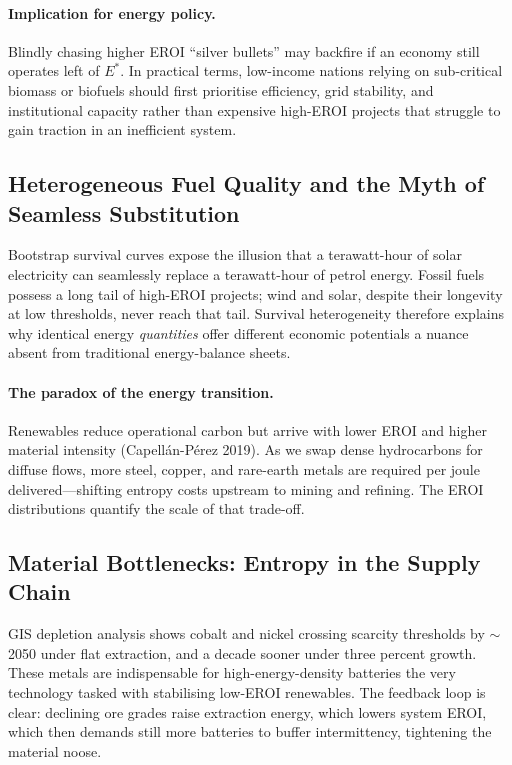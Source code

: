 \documentclass[a4paper,12pt]{article}
\begin{document}
\paragraph{Implication for energy policy.}
Blindly chasing higher EROI “silver bullets” may backfire if an economy still
operates left of \(E^{*}\).  In practical terms, low-income nations relying on
sub-critical biomass or biofuels should first prioritise efficiency, grid
stability, and institutional capacity rather than expensive high-EROI projects
that struggle to gain traction in an inefficient system.

\subsection{Heterogeneous Fuel Quality and the Myth of Seamless Substitution}
\label{sec:disc_hetero}

Bootstrap survival curves expose the illusion that a terawatt-hour of solar
electricity can seamlessly replace a terawatt-hour of petrol energy.  Fossil
fuels possess a long tail of high-EROI projects; wind and solar, despite their
longevity at low thresholds, never reach that tail.  Survival heterogeneity
therefore explains why identical energy \emph{quantities} offer different
economic potentials a nuance absent from traditional energy-balance sheets.

\paragraph{The paradox of the energy transition.}
Renewables reduce operational carbon but arrive with lower EROI and higher
material intensity (Capellán-Pérez 2019).  As we swap dense hydrocarbons
for diffuse flows, more steel, copper, and rare-earth metals are required per
joule delivered—shifting entropy costs upstream to mining and refining.  The
EROI distributions quantify the scale of that trade-off.

\subsection{Material Bottlenecks: Entropy in the Supply Chain}
\label{sec:disc_material}

GIS depletion analysis shows cobalt and nickel crossing scarcity thresholds by
\(\sim\)2050 under flat extraction, and a decade sooner under three percent
growth.  These metals are indispensable for high-energy-density batteries the
very technology tasked with stabilising low-EROI renewables.  The feedback loop
is clear: declining ore grades raise extraction energy, which lowers system
EROI, which then demands still more batteries to buffer intermittency,
tightening the material noose.
\end{document}

